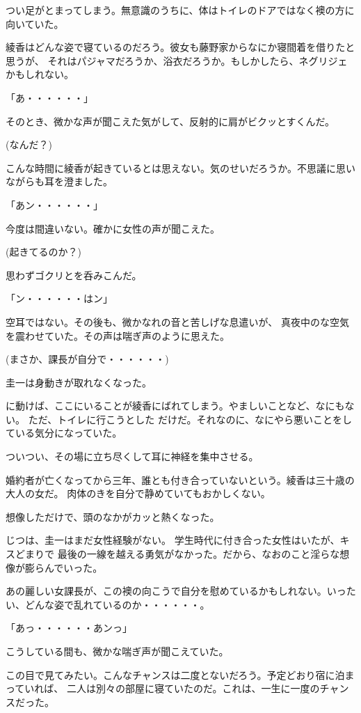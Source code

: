 ﻿\documentclass[book,tate]{jlreq}
\begin{document}
つい足がとまってしまう。無意識のうちに、体はトイレのドアではなく襖の方に向いていた。

綾香はどんな姿で寝ているのだろう。彼女も藤野家からなにか寝間着を借りたと思うが、
それはパジャマだろうか、浴衣だろうか。もしかしたら、ネグリジェかもしれない。

「あ・・・・・・」

そのとき、微かな声が聞こえた気がして、反射的に肩がビクッとすくんだ。

(なんだ？)

こんな時間に綾香が起きているとは思えない。気のせいだろうか。不思議に思いながらも耳を澄ました。

「あン・・・・・・」

今度は間違いない。確かに女性の声が聞こえた。

(起きてるのか？)

思わずゴクリとを呑みこんだ。

「ン・・・・・・はン」

空耳ではない。その後も、微かなれの音と苦しげな息遣いが、
真夜中のな空気を震わせていた。その声は喘ぎ声のように思えた。

(まさか、課長が自分で・・・・・・)

圭一は身動きが取れなくなった。

に動けば、ここにいることが綾香にばれてしまう。やましいことなど、なにもない。
ただ、トイレに行こうとした だけだ。それなのに、なにやら悪いことをしている気分になっていた。

ついつい、その場に立ち尽くして耳に神経を集中させる。

婚約者が亡くなってから三年、誰とも付き合っていないという。綾香は三十歳の大人の女だ。
肉体のきを自分で静めていてもおかしくない。

想像しただけで、頭のなかがカッと熱くなった。

じつは、圭一はまだ女性経験がない。 学生時代に付き合った女性はいたが、キスどまりで
最後の一線を越える勇気がなかった。だから、なおのこと淫らな想像が膨らんでいった。

あの麗しい女課長が、この襖の向こうで自分を慰めているかもしれない。いったい、どんな姿で乱れているのか・・・・・・。

「あっ・・・・・・あンっ」

こうしている間も、微かな喘ぎ声が聞こえていた。

この目で見てみたい。こんなチャンスは二度とないだろう。予定どおり宿に泊まっていれば、
二人は別々の部屋に寝ていたのだ。これは、一生に一度のチャンスだった。
\end{document}

